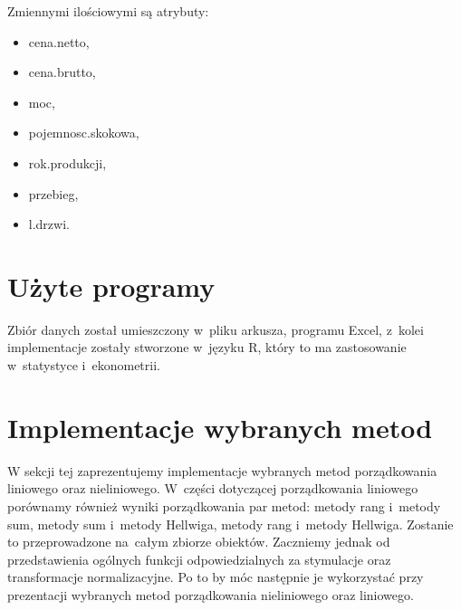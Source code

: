 \documentclass[12pt,a4paper]{report}
\begin{document}
Zmiennymi ilościowymi są atrybuty:
\begin{multicols}{3}
\begin{itemize}
 \item cena.netto,%
 \item cena.brutto,%
 \item moc,%
 \item pojemnosc.skokowa,%
 \item rok.produkcji, %
 \item przebieg,%
 \item l.drzwi. %
\end{itemize}
\end{multicols}

%

\section{Użyte programy}
Zbiór danych został umieszczony w~pliku arkusza, programu Excel, z~kolei implementacje zostały stworzone w~języku R, który to ma zastosowanie w~statystyce i~ekonometrii. 


\section{Implementacje wybranych metod}
W sekcji tej zaprezentujemy implementacje wybranych metod porządkowania liniowego oraz nieliniowego. W~części dotyczącej porządkowania liniowego porównamy również wyniki porządkowania par metod: metody rang i~metody sum, metody sum i~metody Hellwiga, metody rang i~metody Hellwiga. Zostanie to przeprowadzone na~całym zbiorze obiektów. 
Zaczniemy jednak od przedstawienia ogólnych funkcji odpowiedzialnych za stymulacje oraz transformacje normalizacyjne. Po to by móc następnie je wykorzystać przy prezentacji wybranych metod porządkowania nieliniowego oraz liniowego. 
\end{document}
